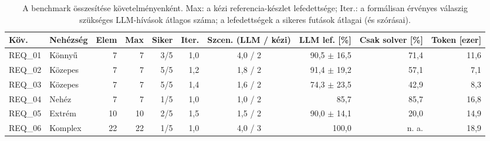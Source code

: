 \begin{table}[htbp]
  \centering
  \small
  \caption{A benchmark összesítése követelményenként. Max: a kézi referencia-készlet lefedettsége; Iter.: a formálisan érvényes válaszig szükséges LLM-hívások átlagos száma; a lefedettségek a sikeres futások átlagai (és szórásai).}
  \label{tab:benchmark-summary}
  \begin{tabular}{llrrrrcrrr}
    \toprule
    Köv. & Nehézség & Elem & Max & Siker & Iter. & Szcen. (LLM / kézi) & LLM lef. [\%] & Csak solver [\%] & Token [ezer] \\
    \midrule
    REQ\_01 & Könnyű & 7 & 7 & 3/5 & 1,0 & 4,0 / 2 & 90,5 $\pm$ 16,5 & 71,4 & 11,6 \\
    REQ\_02 & Közepes & 7 & 7 & 5/5 & 1,2 & 1,8 / 2 & 91,4 $\pm$ 19,2 & 57,1 & 7,1 \\
    REQ\_03 & Közepes & 7 & 7 & 5/5 & 1,4 & 1,6 / 2 & 74,3 $\pm$ 23,5 & 42,9 & 8,3 \\
    REQ\_04 & Nehéz & 7 & 7 & 1/5 & 1,0 & 1,0 / 2 & 85,7 & 85,7 & 16,8 \\
    REQ\_05 & Extrém & 10 & 10 & 2/5 & 1,5 & 1,5 / 2 & 90,0 $\pm$ 14,1 & 20,0 & 14,9 \\
    REQ\_06 & Komplex & 22 & 22 & 1/5 & 1,0 & 4,0 / 3 & 100,0 & n. a. & 18,9 \\
    \bottomrule
  \end{tabular}
\end{table}
